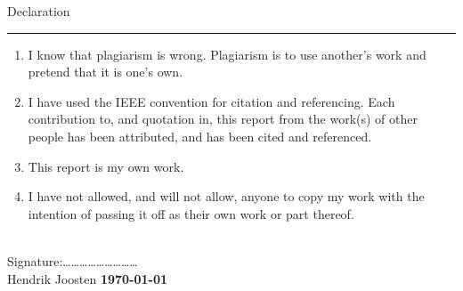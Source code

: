 \pagestyle{plain}


{\Large Declaration}\\
\hrule
\vskip 5mm

\begin{enumerate}
\item I know that plagiarism is wrong. Plagiarism is to use another's work and pretend that it is one's
own.
\item I have used the IEEE convention for citation and referencing. Each contribution to, and quotation in,
this report from the work(s) of other people has been attributed, and has been cited and
referenced.
\item This report is my own work.
\item I have not allowed, and will not allow, anyone to copy my work with the intention of passing it off
as their own work or part thereof.
\end{enumerate}
\vskip 10mm

\hspace{2cm}\\
Signature:\ldots\ldots\ldots\ldots\ldots\ldots\ldots\ldots\ldots
\\\hspace{2cm}Hendrik Joosten
\vskip 10mm
{\bf \today}
